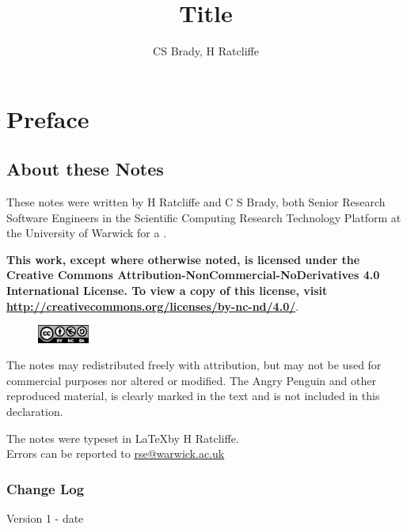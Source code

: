 \documentclass[12pt, openany]{book}
\title{Title}
\author{CS Brady, H Ratcliffe}
\begin{document}





\let\cleardoublepage\clearpage
\setcounter{tocdepth}{1}

\tableofcontents

\frontmatter \chapter{Preface}
\section{About these Notes}
These notes were written by H Ratcliffe and C S Brady, both Senior Research Software Engineers in the Scientific Computing Research Technology Platform at the University of Warwick for a . 

\textbf{This work, except where otherwise noted, is licensed under the Creative Commons Attribution-NonCommercial-NoDerivatives 4.0 International License. To view a copy of this license, visit \url{http://creativecommons.org/licenses/by-nc-nd/4.0/}}. 
\begin{figure}[h]
\includegraphics[width=0.15\textwidth]{by-nc-sa-eu}
\end{figure}

\noindent The notes may redistributed freely with attribution, but may not be used for commercial purposes nor altered or modified. The Angry Penguin and other reproduced material, is clearly marked in the text and is not included in this declaration. 

The notes  were typeset in \LaTeX by H Ratcliffe. \\Errors can be reported to \href{mailto:rse@warwick.ac.uk}{rse@warwick.ac.uk}

\subsection{Change Log}
\currfilename
Version 1 - date
\end{document}
